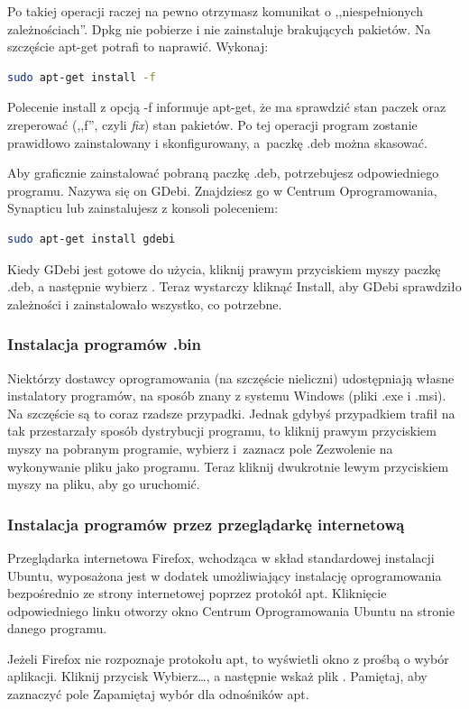 Po takiej operacji raczej na pewno otrzymasz komunikat o ,,niespełnionych zależnościach''. Dpkg nie pobierze i nie zainstaluje brakujących pakietów. Na szczęście apt-get potrafi to naprawić. Wykonaj:
\begin{lstlisting}[language=bash]
sudo apt-get install -f
\end{lstlisting}

Polecenie \textcolor{ubuntu_orange}{install} z opcją \textcolor{ubuntu_orange}{-f} informuje apt-get, że ma sprawdzić stan paczek oraz zreperować (,,f'', czyli \textit{fix}) stan pakietów. Po tej operacji program zostanie prawidłowo zainstalowany i skonfigurowany, a~paczkę .deb można skasować.

Aby graficznie zainstalować pobraną paczkę .deb, potrzebujesz odpowiedniego programu. Nazywa się on \textcolor{ubuntu_orange}{GDebi}. Znajdziesz go w Centrum Oprogramowania, Synapticu lub zainstalujesz z konsoli poleceniem:
\begin{lstlisting}[language=bash]
sudo apt-get install gdebi
\end{lstlisting}

Kiedy GDebi jest gotowe do użycia, kliknij prawym przyciskiem myszy paczkę .deb, a następnie wybierz . Teraz wystarczy kliknąć \textcolor{ubuntu_orange}{Install}, aby GDebi sprawdziło zależności i zainstalowało wszystko, co potrzebne.

\subsubsection{Instalacja programów .bin}
Niektórzy dostawcy oprogramowania (na szczęście nieliczni) udostępniają własne instalatory programów, na sposób znany z systemu Windows (pliki .exe i .msi). Na szczęście są to coraz rzadsze przypadki. Jednak gdybyś przypadkiem trafił na tak przestarzały sposób dystrybucji programu, to kliknij prawym przyciskiem myszy na pobranym programie, wybierz  i~zaznacz pole \textcolor{ubuntu_orange}{Zezwolenie na wykonywanie pliku jako programu}. Teraz kliknij dwukrotnie lewym przyciskiem myszy na pliku, aby go uruchomić.

\subsubsection{Instalacja programów przez przeglądarkę internetową}
Przeglądarka internetowa Firefox, wchodząca w skład standardowej instalacji Ubuntu, wyposażona jest w dodatek umożliwiający instalację oprogramowania bezpośrednio ze strony internetowej poprzez protokół apt. Kliknięcie odpowiedniego linku otworzy okno \textcolor{ubuntu_orange}{Centrum Oprogramowania Ubuntu} na stronie danego programu.

Jeżeli Firefox nie rozpoznaje protokołu apt, to wyświetli okno z prośbą o wybór aplikacji. Kliknij przycisk \textcolor{ubuntu_orange}{Wybierz\ldots}, a następnie wskaż plik . Pamiętaj, aby zaznaczyć pole \textcolor{ubuntu_orange}{Zapamiętaj wybór dla odnośników apt}.
\clearpage
